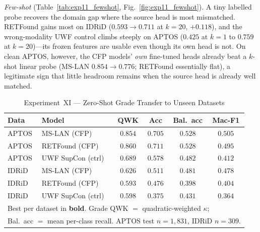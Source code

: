 \documentclass[journal,twoside,web]{ieeecolor}
\begin{document}
\emph{Few-shot} (Table~\ref{tab:exp11_fewshot}, Fig.~\ref{fig:exp11_fewshot}). A tiny
labelled probe recovers the domain gap where the source head is most mismatched.
RETFound gains most on IDRiD ($0.593\!\to\!0.711$ at $k{=}20$, $+0.118$), and the
wrong-modality UWF control climbs steeply on APTOS ($0.425$ at $k{=}1$ to $0.759$ at
$k{=}20$)---its frozen features are usable even though its own head is not. On clean
APTOS, however, the CFP models' \emph{own} fine-tuned heads already beat a $k$-shot
linear probe (MS-LAN $0.854\!\to\!0.776$; RETFound essentially flat), a legitimate
sign that little headroom remains when the source head is already well matched.

\begin{table}[!t]
\caption{Experiment~XI --- Zero-Shot Grade Transfer to Unseen Datasets}
\label{tab:exp11_zeroshot}
\centering
\setlength{\tabcolsep}{4pt}
\begin{tabular}{|l|l|c|c|c|c|}
\hline
\textbf{Data} & \textbf{Model} & \textbf{QWK} & \textbf{Acc} & \textbf{Bal.\ acc} & \textbf{Mac-F1} \\
\hline
APTOS & MS-LAN (CFP) & $0.854$ & $0.705$ & $0.528$ & $0.505$ \\
APTOS & RETFound (CFP) & $\mathbf{0.860}$ & $\mathbf{0.711}$ & $0.528$ & $0.495$ \\
APTOS & UWF SupCon (ctrl) & $0.689$ & $0.578$ & $0.482$ & $0.412$ \\
\hline
IDRiD & MS-LAN (CFP) & $\mathbf{0.626}$ & $\mathbf{0.511}$ & $0.481$ & $0.478$ \\
IDRiD & RETFound (CFP) & $0.593$ & $0.476$ & $0.398$ & $0.404$ \\
IDRiD & UWF SupCon (ctrl) & $0.598$ & $0.375$ & $0.431$ & $0.364$ \\
\hline
\multicolumn{6}{|l|}{\footnotesize Best per dataset in \textbf{bold}. Grade QWK $=$
quadratic-weighted $\kappa$;} \\
\multicolumn{6}{|l|}{\footnotesize Bal.\ acc $=$ mean per-class recall. APTOS test
$n{=}1{,}831$, IDRiD $n{=}309$.} \\
\hline
\end{tabular}
\end{table}
\end{document}
